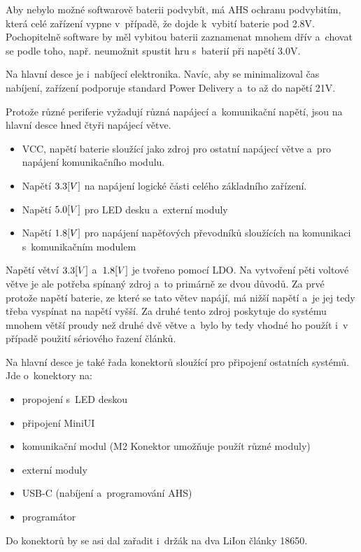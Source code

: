 Aby nebylo možné softwarově baterii podvybít, má AHS ochranu podvybitím, která celé zařízení vypne v~případě, že dojde k~vybití baterie pod 2.8V.
Pochopitelně software by měl vybitou baterii zaznamenat mnohem dřív a~chovat se podle toho, např. neumožnit spustit hru s~baterií při napětí 3.0V.

Na hlavní desce je i~nabíjecí elektronika.
Navíc, aby se minimalizoval čas nabíjení, zařízení podporuje standard Power Delivery a~to až do napětí 21V.

Protože různé periferie vyžadují různá napájecí a~komunikační napětí, jsou na hlavní desce hned čtyři napájecí větve.
\begin{itemize}
    \item VCC, napětí baterie sloužící jako zdroj pro ostatní napájecí větve a~pro napájení komunikačního modulu. 
    \item Napětí \(3.3\-[V]\) na napájení logické části celého základního zařízení.
    \item Napětí \(5.0\-[V]\) pro LED desku a~externí moduly
    \item Napětí \(1.8\-[V]\) pro napájení napěťových převodníků sloužících na komunikaci s~komunikačním modulem 
\end{itemize}
Napětí větví \(3.3\-[V]\) a~\(1.8\-[V]\) je tvořeno pomocí LDO.
Na vytvoření pěti voltové větve je ale potřeba spínaný zdroj a~to primárně ze dvou důvodů.
Za prvé protože napětí baterie, ze které se tato větev napájí, má nižší napětí a~je jej tedy třeba vyspínat na napětí vyšší.
Za druhé tento zdroj poskytuje do systému mnohem větší proudy než druhé dvě větve a~bylo by tedy vhodné ho použít i~v případě použití sériového řazení článků.

Na hlavní desce je také řada konektorů sloužící pro připojení ostatních systémů.
Jde o~konektory na:
\begin{itemize}
    \item propojení s~LED deskou                                            %
    \item připojení MiniUI                                                  %
    \item komunikační modul (M2 Konektor umožňuje použít různé moduly)      %
    \item externí moduly                                                    %
    \item USB-C (nabíjení a~programování AHS)                               %
    \item programátor                                                       %
\end{itemize}
Do konektorů by se asi dal zařadit i~držák na dva LiIon články 18650.

